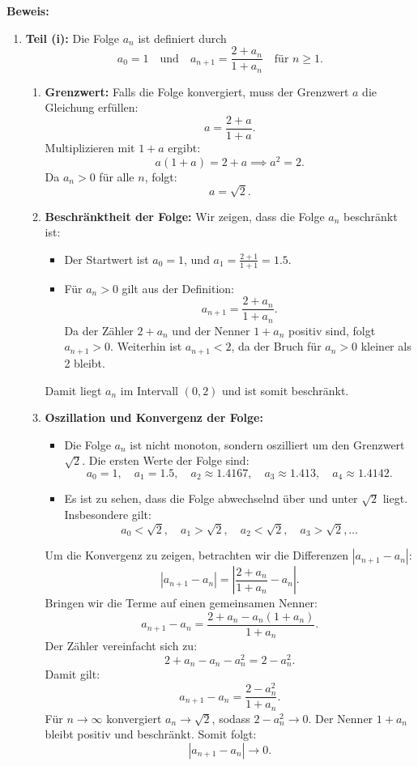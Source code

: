 \documentclass[11pt]{article}
\begin{document}
\textbf{Beweis:}
\begin{enumerate}
    \item \textbf{Teil (i):} Die Folge $a_n$ ist definiert durch
    \[
    a_0 = 1 \quad \text{und} \quad a_{n+1} = \frac{2 + a_n}{1 + a_n} \quad \text{für } n \geq 1.
    \]
    \begin{enumerate}
        \item \textbf{Grenzwert:} Falls die Folge konvergiert, muss der Grenzwert $a$ die Gleichung erfüllen:
        \[
        a = \frac{2 + a}{1 + a}.
        \]
        Multiplizieren mit $1+a$ ergibt:
        \[
        a (1 + a) = 2 + a \implies a^2 = 2.
        \]
        Da $a_n > 0$ für alle $n$, folgt:
        \[
        a = \sqrt{2}.
        \]

        \item \textbf{Beschränktheit der Folge:} Wir zeigen, dass die Folge $a_n$ beschränkt ist:
        \begin{itemize}
            \item Der Startwert ist $a_0 = 1$, und $a_1 = \frac{2+1}{1+1} = 1.5$.
            \item Für $a_n > 0$ gilt aus der Definition:
            \[
            a_{n+1} = \frac{2 + a_n}{1 + a_n}.
            \]
            Da der Zähler $2 + a_n$ und der Nenner $1 + a_n$ positiv sind, folgt $a_{n+1} > 0$. Weiterhin ist $a_{n+1} < 2$, da der Bruch für $a_n > 0$ kleiner als 2 bleibt.
        \end{itemize}
        Damit liegt $a_n$ im Intervall $(0, 2)$ und ist somit beschränkt.

        \item \textbf{Oszillation und Konvergenz der Folge:}
        \begin{itemize}
            \item Die Folge $a_n$ ist nicht monoton, sondern oszilliert um den Grenzwert $\sqrt{2}$. Die ersten Werte der Folge sind:
            \[
            a_0 = 1, \quad a_1 = 1.5, \quad a_2 \approx 1.4167, \quad a_3 \approx 1.413, \quad a_4 \approx 1.4142.
            \]
            \item Es ist zu sehen, dass die Folge abwechselnd über und unter $\sqrt{2}$ liegt. Insbesondere gilt:
            \[
            a_0 < \sqrt{2}, \quad a_1 > \sqrt{2}, \quad a_2 < \sqrt{2}, \quad a_3 > \sqrt{2}, \dots
            \]
        \end{itemize}

        Um die Konvergenz zu zeigen, betrachten wir die Differenzen \( |a_{n+1} - a_n| \):
        \[
        |a_{n+1} - a_n| = \left| \frac{2 + a_n}{1 + a_n} - a_n \right|.
        \]
        Bringen wir die Terme auf einen gemeinsamen Nenner:
        \[
        a_{n+1} - a_n = \frac{2 + a_n - a_n(1 + a_n)}{1 + a_n}.
        \]
        Der Zähler vereinfacht sich zu:
        \[
        2 + a_n - a_n - a_n^2 = 2 - a_n^2.
        \]
        Damit gilt:
        \[
        a_{n+1} - a_n = \frac{2 - a_n^2}{1 + a_n}.
        \]
        Für \( n \to \infty \) konvergiert \( a_n \to \sqrt{2} \), sodass \( 2 - a_n^2 \to 0 \). Der Nenner \( 1 + a_n \) bleibt positiv und beschränkt. Somit folgt:
        \[
        |a_{n+1} - a_n| \to 0.
        \]


\end{enumerate}
\end{enumerate}
\end{document}
